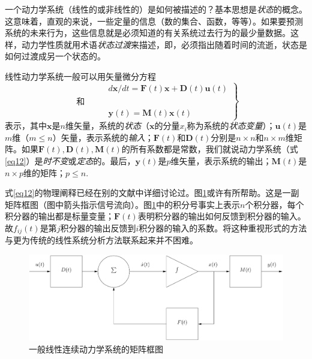 \documentclass[UTF8,adobefonts]{ctexart}
\begin{document}
一个动力学系统（线性的或非线性的）是如何被描述的？基本思想是\emph{状态}的概念。这意味着，直观的来说，一些定量的信息（数的集合、函数，等等）。如果要预测系统的未来行为，这些信息就是必须知道的有关系统过去行为的最少量数据。这样，动力学性质就用术语\emph{状态过渡}来描述，即，必须指出随着时间的流逝，状态是如何过渡成另一个状态的。

线性动力学系统一般可以用矢量微分方程
\begin{equation}
\label{eq12}
\left.\begin{aligned}
&d\mathbf{x}/dt=\mathbf{F}(t)\mathbf{x}+\mathbf{D}(t)\mathbf{u}(t)\\
\text{和}\qquad&\\
&\mathbf{y}(t)=\mathbf{M}(t)\mathbf{x}(t)
\end{aligned}\right\}
\end{equation}
表示，其中$\mathbf{x}$是$n$维矢量，系统的\emph{状态}（$\mathbf{x}$的分量$x_i$称为系统的\emph{状态变量}）；$\mathbf{u}(t)$是$m$维（$m \le n$）矢量，表示系统的\emph{输入}；$\mathbf{F}(t)$和$\mathbf{D}(t)$分别是$n \times n$和$n \times m$维矩阵。如果$\mathbf{F}(t),\mathbf{D}(t),\mathbf{M}(t)$的所有系数都是常数，我们就说动力学系统（式\ref{eq12}）是\emph{时不变}或\emph{定态}的。最后，$\mathbf{y}(t)$是$p$维矢量，表示系统的输出；$\mathbf{M}(t)$是$n \times p$维的矩阵；$p \le n$.

式\ref{eq12}的物理阐释已经在别的文献中详细讨论过\cite{rf18,rf20,rf23}。图\ref{fg1}或许有所帮助。这是一副矩阵框图（图中箭头指示信号流向）。图\ref{fg1}中的积分号事实上表示$n$个积分器，每个积分器的输出都是标量变量；$\mathbf{F}(t)$表明积分器的输出如何反馈到积分器的输入。故$f_{ij}(t)$是第$j$积分器的输出反馈到$i$积分器的输入的系数。将这种重视形式的方法与更为传统的线性系统分析方法联系起来并不困难。
\begin{figure}[htbp]
\centering
\includegraphics[width=0.5\paperwidth]{fig/fg1.pdf}
\caption{一般线性连续动力学系统的矩阵框图}
\label{fg1}
\end{figure}
\end{document}
